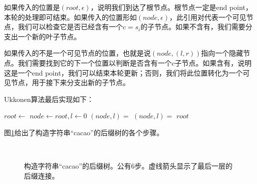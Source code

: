 \documentclass[UTF8]{article}
\begin{document}
如果传入的位置是$(root, \epsilon)$，说明我们到达了根节点。根节点一定是end point，本轮的处理即可结束。如果传入的位置形如$(node, \epsilon)$，此引用对代表一个可见节点，我们可以检查它是否已经含有一个$c=s_i$的子节点。如果不含有，我们需要分支出一个新的叶子节点。

如果传入的不是一个可见节点的位置，也就是说$(node, (l, r))$指向一个隐藏节点。我们需要找到它的下一个位置以判断是否含有一个$c$子节点。如果含有，说明这是一个end point，我们可以结束本轮更新；否则，我们将此位置转化为一个可见节点，用于接下来分支出新的子节点。

Ukkonen算法最后实现如下：

\begin{algorithmic}[1]
  \State $root \gets$ 
  \State $node \gets root, l \gets 0$
    \State $(node, l) = $ 
    \State $(node, l) = $ 
  \EndFor
  \State \Return $root$
\EndFunction
\end{algorithmic}

图\ref{fig:cons-stree-cacao}给出了构造字符串“cacao”的后缀树的各个步骤。

\begin{figure}[htbp]
  \centering
   \\
  \caption{构造字符串“cacao”的后缀树。公有6步。虚线箭头显示了最后一层的后缀连接。}
  \label{fig:cons-stree-cacao}
\end{figure}
\end{document}
